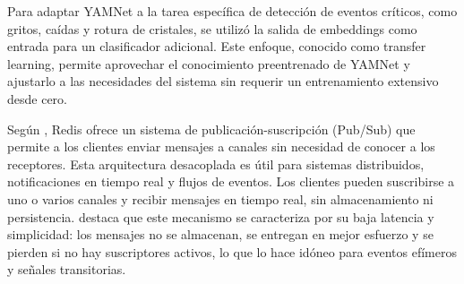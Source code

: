 Para adaptar YAMNet a la tarea específica de detección de eventos críticos, como gritos, caídas y rotura de cristales, se utilizó la salida de embeddings como entrada para un clasificador adicional. Este enfoque, conocido como transfer learning, permite aprovechar el conocimiento preentrenado de YAMNet y ajustarlo a las necesidades del sistema sin requerir un entrenamiento extensivo desde cero.

Según \citeauthor{carlson2013action} \citeyear{carlson2013action}, Redis ofrece un sistema de publicación-suscripción (Pub/Sub) que permite a los clientes enviar mensajes a canales sin necesidad de conocer a los receptores. Esta arquitectura desacoplada es útil para sistemas distribuidos, notificaciones en tiempo real y flujos de eventos. Los clientes pueden suscribirse a uno o varios canales y recibir mensajes en tiempo real, sin almacenamiento ni persistencia. \citeauthor{carlson2013action} \citeyear{carlson2013action} destaca que este mecanismo se caracteriza por su baja latencia y simplicidad: los mensajes no se almacenan, se entregan en mejor esfuerzo y se pierden si no hay suscriptores activos, lo que lo hace idóneo para eventos efímeros y señales transitorias.
